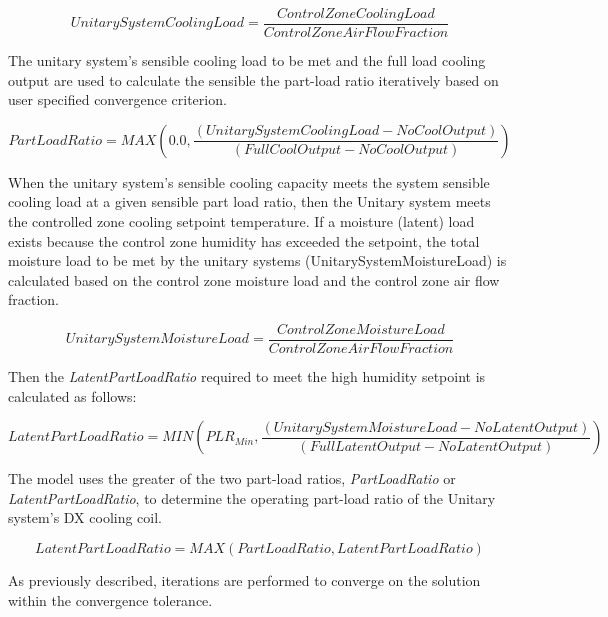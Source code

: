 \begin{equation}
UnitarySystemCoolingLoad = \frac{{ControlZoneCoolingLoad}}{{ControlZoneAirFlowFraction}}
\end{equation}

The unitary system's sensible cooling load to be met and the full load cooling output are used to calculate the sensible the part-load ratio iteratively based on user specified convergence criterion.

\begin{equation}
PartLoadRatio = MAX\left( {0.0,\frac{{\left( {UnitarySystemCoolingLoad - NoCoolOutput} \right)}}{{\left( {FullCoolOutput - NoCoolOutput} \right)}}} \right)
\end{equation}

When the unitary system's sensible cooling capacity meets the system sensible cooling load at a given sensible part load ratio, then the Unitary system meets the controlled zone cooling setpoint temperature. If a moisture (latent) load exists because the control zone humidity has exceeded the setpoint, the total moisture load to be met by the unitary systems (UnitarySystemMoistureLoad) is calculated based on the control zone moisture load and the control zone air flow fraction.

\begin{equation}
UnitarySystemMoistureLoad = \frac{{ControlZoneMoistureLoad}}{{ControlZoneAirFlowFraction}}
\end{equation}

Then the \emph{LatentPartLoadRatio} required to meet the high humidity setpoint is calculated as follows:

\begin{equation}
  LatentPartLoadRatio = MIN\left( {PL{R_{Min}},\frac{{\left( {UnitarySystemMoistureLoad - NoLatentOutput} \right)}}{{\left( {FullLatentOutput - NoLatentOutput} \right)}}} \right)
\end{equation}

The model uses the greater of the two part-load ratios, \emph{PartLoadRatio} or \emph{LatentPartLoadRatio}, to determine the operating part-load ratio of the Unitary system's DX cooling coil.

\begin{equation}
LatentPartLoadRatio = MAX\left( {PartLoadRatio,LatentPartLoadRatio} \right)
\end{equation}

As previously described, iterations are performed to converge on the solution within the convergence tolerance.

